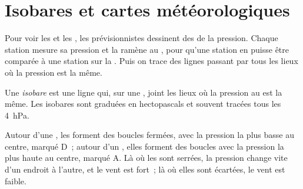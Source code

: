 \section{Isobares et cartes météorologiques}

Pour voir les  et les , les prévisionnistes
dessinent des  de la pression. Chaque station mesure sa pression et
la ramène au , pour qu'une station en  puisse être
comparée à une station sur la . Puis on trace des lignes passant par
tous les lieux où la pression est la même.

\begin{definition}[Isobare]\label{def:g8:fronts-and-weather-maps:isobar}
Une \emph{isobare} est une ligne qui, sur une , joint
les lieux où la pression au  est la même. Les isobares
sont graduées en hectopascals et souvent tracées tous les \qty{4}{hPa}.
\end{definition}

Autour d'une , les  forment des boucles fermées, avec la
pression la plus basse au centre, marqué D~; autour d'un ,
elles forment des boucles avec la pression la plus haute au centre, marqué
A. Là où les  sont serrées, la pression change vite d'un endroit à
l'autre, et le vent est fort~; là où elles sont écartées, le vent est
faible.

